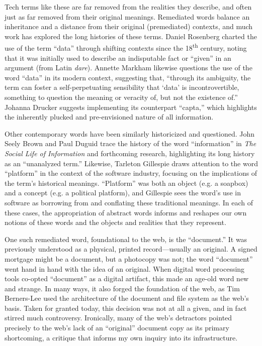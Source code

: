 Tech terms like these are far removed from the realities they describe, and often just as far removed from their original meanings. Remediated words balance an inheritance and a distance from their original (premediated) contexts, and much work has explored the long histories of these terms. Daniel Rosenberg charted the use of the term ``data'' through shifting contexts since the 18\textsuperscript{th} century, noting that it was initially used to describe an indisputable fact or ``given'' in an argument (from Latin \emph{dare}).\autocite[15-40]{rosenberg_data_2013}  Annette Markham likewise questions the use of the word ``data'' in its modern context, suggesting that, ``through its ambiguity, the term can foster a self-perpetuating sensibility that `data' is incontrovertible, something to question the meaning or veracity of, but not the existence of.''\autocite{markham_undermining_2013} Johanna Drucker suggests implementing its counterpart ``capta,'' which highlights the inherently plucked and pre-envisioned nature of all information.\autocite{drucker_humanities_2011}

Other contemporary words have been similarly historicized and questioned. John Seely Brown and Paul Duguid trace the history of the word ``information'' in \emph{The Social Life of Information} and forthcoming research, highlighting its long history as an ``unanalyzed term.''\autocite{brown_social_2002} Likewise, Tarleton Gillespie draws attention to the word ``platform'' in the context of the software industry, focusing on the implications of the term's historical meanings.\autocite{gillespie_politics_2010} ``Platform'' was both an object (e.g. a soapbox) and a concept (e.g. a political platform), and Gillespie sees the word's use in software as borrowing from and conflating these traditional meanings. In each of these cases, the appropriation of abstract words informs and reshapes our own notions of these words and the objects and realities that they represent.

One such remediated word, foundational to the web, is the ``document.'' It was previously understood as a physical, printed record---usually an original. A signed mortgage might be a document, but a photocopy was not; the word ``document'' went hand in hand with the idea of an original. When digital word processing tools co-opted ``document'' as a digital artifact, this made an age-old word new and strange. In many ways, it also forged the foundation of the web, as Tim Berners-Lee used the architecture of the document and file system as the web's basis.\autocite{berners-lee_weaving_2000} Taken for granted today, this decision was not at all a given, and in fact stirred much controversy. Ironically, many of the web's detractors pointed precisely to the web's lack of an ``original'' document copy as its primary shortcoming, a critique that informs my own inquiry into its infrastructure.\autocite[ch. 18]{nelson_ted_1999,lanier_who_2013}

